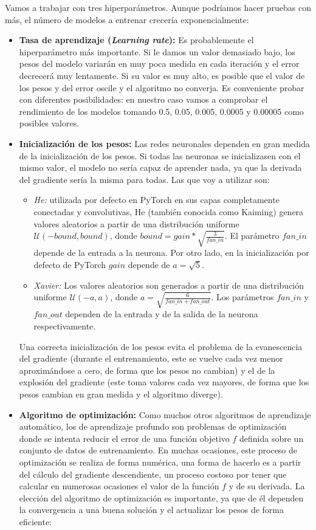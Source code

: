 Vamos a trabajar con tres hiperparámetros. Aunque podríamos hacer pruebas con más, el número de modelos a entrenar crecería exponencialmente:
\begin{itemize}
    \item \textbf{Tasa de aprendizaje (\textit{Learning rate}):} Es probablemente el hiperparámetro más importante. Si le damos un valor demasiado bajo, los pesos del modelo variarán en muy poca medida en cada iteración y el error decrecerá muy lentamente. Si su valor es muy alto, es posible que el valor de los pesos y del error oscile y el algoritmo no converja. Es conveniente probar con diferentes posibilidades: en nuestro caso vamos a comprobar el rendimiento de los modelos tomando 0.5, 0.05, 0.005, 0.0005 y 0.00005 como posibles valores. \cite{berzal2018redes}
    \item \textbf{Inicialización de los pesos:} Las redes neuronales dependen en gran medida de la inicialización de los pesos. Si todas las neuronas se inicializasen con el mismo valor, el modelo no sería capaz de aprender nada, ya que la derivada del gradiente sería la misma para todas. Las que voy a utilizar son: \cite{pytorch-doc}
    \begin{itemize}
        \item \textit{He:} utilizada por defecto en PyTorch en sus capas completamente conectadas y convolutivas, He (también conocida como Kaiming) genera valores aleatorios a partir de una distribución uniforme $\mathcal{U}(-bound, bound)$, donde $bound = gain * \sqrt{\frac{3}{fan\_in}}$. El parámetro $fan\_in$ depende de la entrada a la neurona. Por otro lado, en la inicialización por defecto de PyTorch $gain$ depende de $a = \sqrt{5}$.
        \item \textit{Xavier:} Los valores aleatorios son generados a partir de una distribución uniforme $\mathcal{U}(-a, a)$, donde $a = \sqrt{\frac{6}{fan\_in + fan\_out}}$. Los parámetros $fan\_in$ y $fan\_out$ dependen de la entrada y de la salida de la neurona respectivamente.
    \end{itemize}
    Una correcta inicialización de los pesos evita el problema de la evanescencia del gradiente (durante el entrenamiento, este se vuelve cada vez menor aproximándose a cero, de forma que los pesos no cambian) y el de la explosión del gradiente (este toma valores cada vez mayores, de forma que los pesos cambian en gran medida y el algoritmo diverge).
    \item \textbf{Algoritmo de optimización:} Como muchos otros algoritmos de aprendizaje automático, los de aprendizaje profundo son problemas de optimización donde se intenta reducir el error de una función objetivo $f$ definida sobre un conjunto de datos de entrenamiento. En muchas ocasiones, este proceso de optimización se realiza de forma numérica, una forma de hacerlo es a partir del cálculo del gradiente descendiente, un proceso costoso por tener que calcular en numerosas ocasiones el valor de la función $f$ y de su derivada. La elección del algoritmo de optimización es importante, ya que de él dependen la convergencia a una buena solución y el actualizar los pesos de forma eficiente: \cite{berzal2018redes}

\end{itemize}
